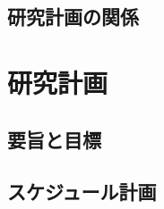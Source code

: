 \documentclass[UTF8]{ctexart}
\theoremstyle{plain}
\begin{document}
\subsection{研究計画の関係}





\section{研究計画}
\subsection{要旨と目標}

\subsection{スケジュール計画}




\medskip


\end{document}
